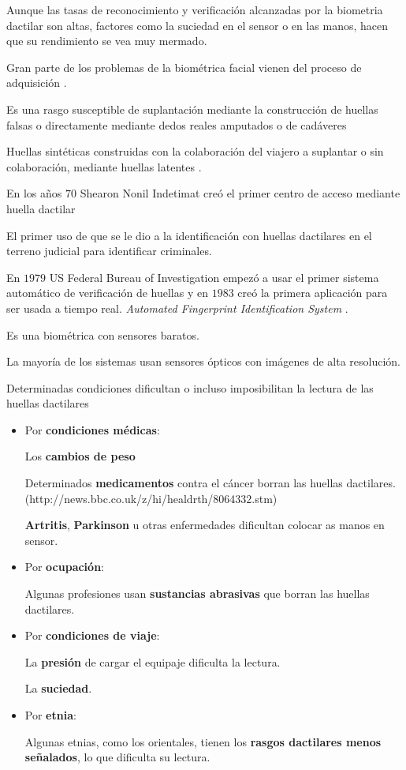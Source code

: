 Aunque las tasas de reconocimiento y verificación alcanzadas por la \gls{biometria} dactilar son altas, factores como la suciedad en el sensor o en las manos, hacen que su rendimiento se vea muy mermado.

Gran parte de los problemas de la biométrica \gls{facial} vienen del proceso de adquisición \cite{labati2015automatic}.


Es una rasgo susceptible de suplantación mediante la construcción de huellas falsas o directamente mediante dedos reales amputados o de cadáveres

Huellas sintéticas construidas con la colaboración del viajero a suplantar o sin colaboración, mediante huellas latentes \cite{galbally2011evaluation} \cite{espinoza2011vulnerabilities}.

\color{red}En los años $70$ Shearon Nonil Indetimat creó el primer centro de acceso mediante huella dactilar\color{black}

El primer uso de que se le dio a la identificación con huellas dactilares en el terreno judicial para identificar criminales.

En $1979$ US Federal Bureau of Investigation empezó a usar el primer sistema automático de verificación de huellas y en $1983$ creó la primera aplicación para ser usada a tiempo real. \textit{Automated Fingerprint Identification System }.

Es una biométrica con sensores baratos.

La mayoría de los sistemas  usan sensores ópticos con imágenes de alta resolución.

Determinadas condiciones dificultan o incluso imposibilitan la lectura de las huellas dactilares 

\begin{itemize}
    \item 
    Por \textbf{condiciones médicas}: 

    Los \textbf{cambios de peso}

    Determinados \textbf{medicamentos} contra el cáncer borran las huellas dactilares. (http://news.bbc.co.uk/z/hi/healdrth/8064332.stm)

    \textbf{Artritis}, \textbf{Parkinson} u otras enfermedades dificultan colocar as manos en sensor.
    
    \item
    Por \textbf{ocupación}:
    
    Algunas profesiones usan \textbf{sustancias abrasivas} que borran las huellas dactilares.
    
    \item
    Por \textbf{condiciones de viaje}:
    
    La \textbf{presión} de cargar el equipaje dificulta la lectura.
    
    La \textbf{suciedad}.
    
    \item
    Por \textbf{etnia}:
    
    Algunas etnias, como los orientales, tienen los \textbf{rasgos dactilares menos señalados}, lo que dificulta su lectura.
    
\end{itemize}



